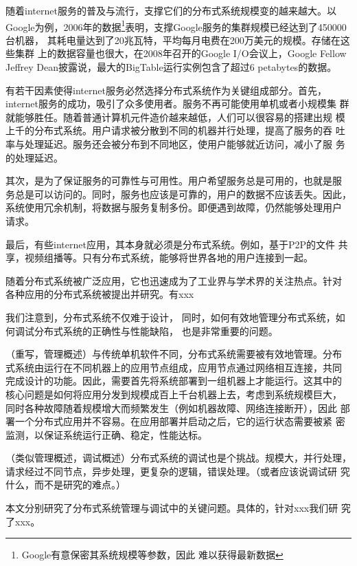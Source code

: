 随着internet服务的普及与流行，支撑它们的分布式系统规模变的越来越大。以
Google为例，2006年的数据\footnote{Google有意保密其系统规模等参数，因此
难以获得最新数据}表明，支撑Google服务的集群规模已经达到了450000台机器，
其耗电量达到了20兆瓦特，平均每月电费在200万美元的规模。存储在这些集群
上的数据容量也很大，在2008年召开的Google I/O会议上，Google Fellow
Jeffrey Dean披露说，最大的BigTable运行实例包含了超过6 petabytes的数据。


有若干因素使得internet服务必然选择分布式系统作为关键组成部分。首先，
internet服务的成功，吸引了众多使用者。服务不再可能使用单机或者小规模集
群就能够胜任。随着普通计算机元件造价越来越低，人们可以很容易的搭建出规
模上千的分布式系统。用户请求被分散到不同的机器并行处理，提高了服务的吞
吐率与处理延迟。服务还会被分布到不同地区，使用户能够就近访问，减小了服
务的处理延迟。

其次，是为了保证服务的可靠性与可用性。用户希望服务总是可用的，也就是服
务总是可以访问的。同时，服务也应该是可靠的，用户的数据不应该丢失。因此，
系统使用冗余机制，将数据与服务复制多份。即便遇到故障，仍然能够处理用户
请求。

最后，有些internet应用，其本身就必须是分布式系统。例如，基于P2P的文件
共享，视频组播等。只有分布式系统，能够将世界各地的用户连接到一起。


随着分布式系统被广泛应用，它也迅速成为了工业界与学术界的关注热点。针对
各种应用的分布式系统被提出并研究。有xxx

我们注意到，分布式系统不仅难于设计，
同时，如何有效地管理分布式系统，如何调试分布式系统的正确性与性能缺陷，
也是非常重要的问题。

（重写，管理概述）与传统单机软件不同，分布式系统需要被有效地管理。分布
式系统由运行在不同机器上的应用节点组成，应用节点通过网络相互连接，共同
完成设计的功能。因此，需要首先将系统部署到一组机器上才能运行。这其中的
核心问题是如何将应用分发到规模成百上千台机器上去，考虑到系统规模巨大，
同时各种故障随着规模增大而频繁发生（例如机器故障、网络连接断开），因此
部署一个分布式应用并不容易。在应用部署并启动之后，它的运行状态需要被紧
密监测，以保证系统运行正确、稳定，性能达标。

（类似管理概述，调试概述）分布式系统的调试也是个挑战。规模大，并行处理，
请求经过不同节点，异步处理，更复杂的逻辑，错误处理。（或者应该说调试研
究什么，而不是研究的难点。）


本文分别研究了分布式系统管理与调试中的关键问题。具体的，针对xxx我们研
究了xxx。

